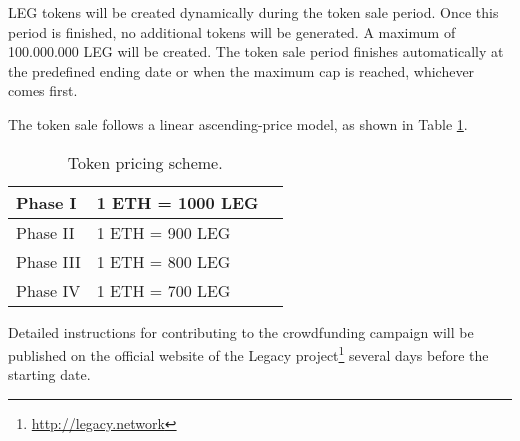 LEG tokens will be created dynamically during the token sale period. Once this period is finished, no additional tokens will be generated. A maximum of 100.000.000 LEG will be created. The token sale period finishes automatically at the predefined ending date or when the maximum cap is reached, whichever comes first.

The token sale follows a linear ascending-price model, as shown in Table \ref{table:ico_token_price}.

\begin{table}[h]
	\begin{center}
		{\renewcommand{\arraystretch}{1.3}	
			\small
			\begin{tabular}{| l | p{5cm} | p{3cm}  |}	
		    	\hline			    
		    	Phase I		&  1 ETH = 1000 LEG \\ \hline
		    	Phase II	&  1 ETH = 900 LEG  \\ \hline
		    	Phase III	&  1 ETH = 800 LEG  \\ \hline
		    	Phase IV	&  1 ETH = 700 LEG  \\ \hline	
			\end{tabular}				
		}
	\caption{Token pricing scheme.}
	\label{table:ico_token_price}		
	\end{center}
\end{table}

Detailed instructions for contributing to the crowdfunding campaign will be published on the official website of the Legacy project\footnote{\url{http://legacy.network}} several days before the starting date.  





